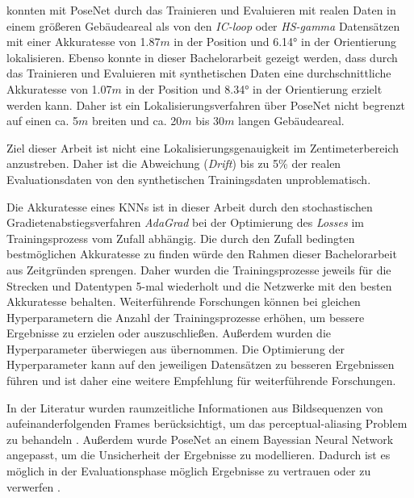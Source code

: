 

\citet{walchImageBasedLocalizationUsing2017} konnten mit PoseNet durch das Trainieren und Evaluieren mit realen Daten in einem größeren Gebäudeareal als von den \textit{IC-loop} oder \textit{HS-gamma} Datensätzen mit einer Akkuratesse von 1.87$m$ in der Position und 6.14° in der Orientierung lokalisieren. Ebenso konnte in dieser Bachelorarbeit gezeigt werden, dass durch das Trainieren und Evaluieren mit synthetischen Daten eine durchschnittliche Akkuratesse von 1.07$m$ in der Position und 8.34° in der Orientierung erzielt werden kann. Daher ist ein Lokalisierungsverfahren über PoseNet nicht begrenzt auf einen ca. 5$m$ breiten und ca. 20$m$ bis 30$m$ langen Gebäudeareal. 












Ziel dieser Arbeit ist nicht eine Lokalisierungsgenauigkeit im Zentimeterbereich anzustreben. Daher ist die Abweichung (\textit{Drift}) bis zu 5\% der realen Evaluationsdaten von den synthetischen Trainingsdaten unproblematisch.



Die Akkuratesse eines KNNs ist in dieser Arbeit durch den stochastischen Gradietenabstiegsverfahren \textit{AdaGrad} bei der Optimierung des \textit{Losses} im Trainingsprozess vom Zufall abhängig. Die durch den Zufall bedingten bestmöglichen Akkuratesse zu finden würde den Rahmen dieser Bachelorarbeit aus Zeitgründen sprengen. Daher wurden die Trainingsprozesse jeweils für die Strecken und Datentypen 5-mal wiederholt und die Netzwerke mit den besten Akkuratesse behalten. Weiterführende Forschungen können bei gleichen Hyperparametern die Anzahl der Trainingsprozesse erhöhen, um bessere Ergebnisse zu erzielen oder auszuschließen. Außerdem wurden die Hyperparameter überwiegen aus \citet{acharyaBIMPoseNetIndoorCamera2019} übernommen. Die Optimierung der Hyperparameter kann auf den jeweiligen Datensätzen zu besseren Ergebnissen führen und ist daher eine weitere Empfehlung für weiterführende Forschungen. 

In der Literatur wurden raumzeitliche Informationen aus Bildsequenzen von aufeinanderfolgenden Frames berücksichtigt, um das perceptual-aliasing Problem zu behandeln \cite{walchImageBasedLocalizationUsing2017, clarkVidLocDeepSpatioTemporal2017}. Außerdem wurde PoseNet an einem Bayessian Neural Network angepasst, um die Unsicherheit der Ergebnisse zu modellieren. Dadurch ist es möglich in der Evaluationsphase möglich Ergebnisse zu vertrauen oder zu verwerfen \cite{kendallModellingUncertaintyDeep2016}. 

